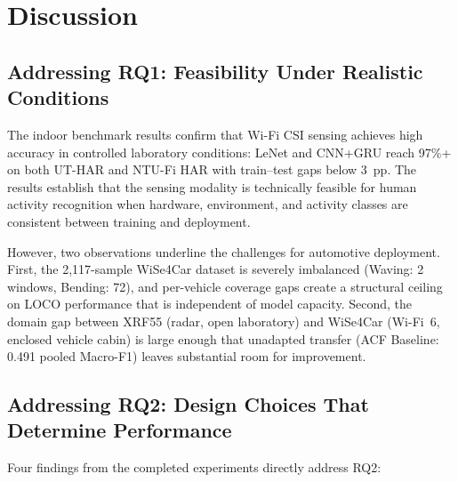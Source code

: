 \documentclass[english,bibtex]{kththesis}
\begin{document}
\section{Discussion}
\label{sec:discussion_ch4}

\subsection{Addressing RQ1: Feasibility Under Realistic Conditions}

The indoor benchmark results confirm that Wi-Fi CSI sensing achieves high accuracy in controlled laboratory conditions: LeNet and CNN+GRU reach 97\%+ on both UT-HAR and NTU-Fi HAR with train--test gaps below 3~pp. The results establish that the sensing modality is technically feasible for human activity recognition when hardware, environment, and activity classes are consistent between training and deployment.

However, two observations underline the challenges for automotive deployment. First, the 2{,}117-sample WiSe4Car dataset is severely imbalanced (Waving: 2 windows, Bending: 72), and per-vehicle coverage gaps create a structural ceiling on LOCO performance that is independent of model capacity. Second, the domain gap between XRF55 (radar, open laboratory) and WiSe4Car (Wi-Fi~6, enclosed vehicle cabin) is large enough that unadapted transfer (ACF Baseline: 0.491 pooled Macro-F1) leaves substantial room for improvement.

\subsection{Addressing RQ2: Design Choices That Determine Performance}

Four findings from the completed experiments directly address RQ2:
\end{document}
